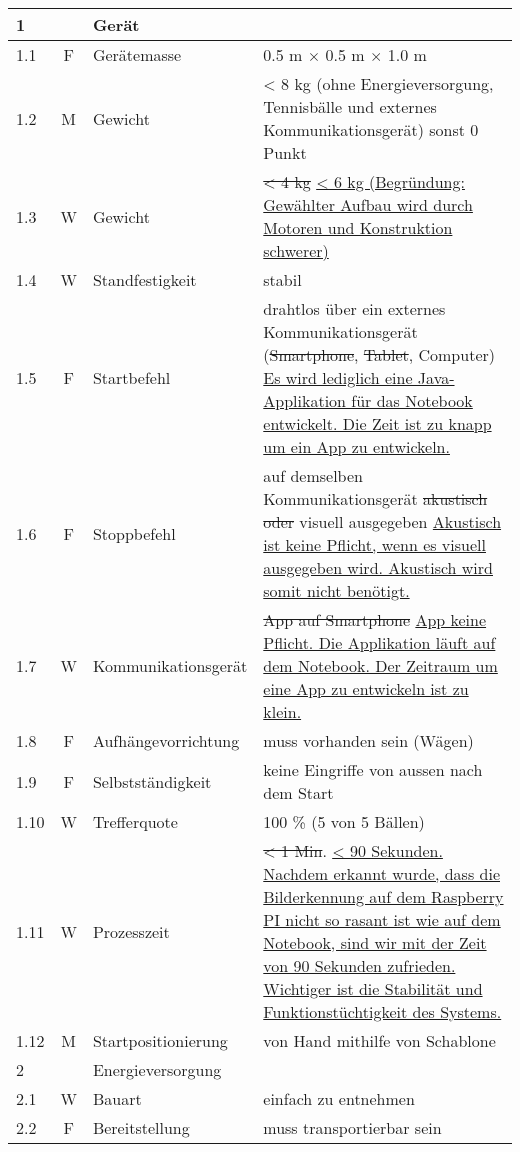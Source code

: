 \begin{longtable}[l]{|l|c|l|p{8.5cm}|}
	\hline 1 &  & Gerät & \\ 
	\hline 1.1 & F & Gerätemasse & 0.5 m $\times$ 0.5 m $\times$ 1.0 m  \\
	\hline 1.2 & M & Gewicht & < 8 kg (ohne Energieversorgung, Tennisbälle und externes Kommunikationsgerät) sonst 0 Punkt \\
	\hline 1.3 & W & Gewicht & \sout{< 4 kg} \newline \uline{< 6 kg (Begründung: Gewählter Aufbau wird durch Motoren und Konstruktion schwerer)} \\
	\hline 1.4 & W & Standfestigkeit & stabil \\
	\hline 1.5 & F & Startbefehl & drahtlos über ein externes Kommunikationsgerät (\sout{Smartphone}, \sout{Tablet}, Computer) \newline \uline{Es wird lediglich eine Java-Applikation für das Notebook entwickelt. Die Zeit ist zu knapp um ein App zu entwickeln.} \\   
	\hline 1.6 & F & Stoppbefehl & auf demselben Kommunikationsgerät \sout{akustisch oder} visuell ausgegeben \newline \uline{Akustisch ist keine Pflicht, wenn es visuell ausgegeben wird. Akustisch wird somit nicht benötigt.}  \\ 
	\hline 1.7 & W & Kommunikationsgerät & \sout{App auf Smartphone} \newline \uline{App keine Pflicht. Die Applikation läuft auf dem Notebook. Der Zeitraum um eine App zu entwickeln ist zu klein.} \\
	\hline 1.8 & F & Aufhängevorrichtung & muss vorhanden sein (Wägen) \\
	\hline 1.9 & F & Selbstständigkeit & keine Eingriffe von aussen nach dem Start \\
	\hline 1.10 & W & Trefferquote & 100 \% (5 von 5 Bällen) \\
	\hline 1.11 & W & Prozesszeit & \sout{< 1 Min}. \newline
	\uline{< 90 Sekunden. Nachdem erkannt wurde, dass die Bilderkennung auf dem Raspberry PI nicht so rasant ist wie auf dem Notebook, sind wir mit der Zeit von 90 Sekunden zufrieden. Wichtiger ist die Stabilität und Funktionstüchtigkeit des Systems.} \\
	\hline 1.12 & M & Startpositionierung & von Hand mithilfe von Schablone \\
	\hline 2 &  & Energieversorgung & \\
	\hline 2.1 & W & Bauart & einfach zu entnehmen  \\
	\hline 2.2 & F & Bereitstellung & muss transportierbar sein  \\

\end{longtable}

